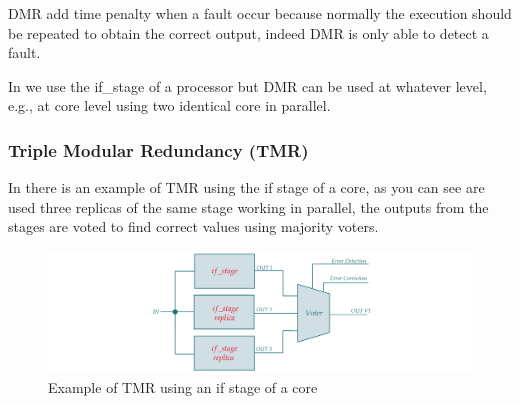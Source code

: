{{{{        		DMR add time penalty when a fault occur because normally the execution should be repeated to obtain the correct output, indeed DMR is only able to detect a fault. 
        		
        		In  we use the if\_stage of a processor but DMR can be used at whatever level, e.g., at core level using two identical core in parallel.
		    }
		    \subsubsection{Triple Modular Redundancy (TMR)}{
		        In  there is an example of TMR using the if stage of a core, as you can see are used three replicas of the same stage working in parallel, the outputs from the stages are voted to find correct values using majority voters.
		        
		        \begin{figure}[H]
        			\centering
        			\includegraphics[scale=0.2,center]{./images/TMR1.png}
        			\caption{Example of TMR using an if stage of a core}
        			\label{fig:TMR1}
        		\end{figure} 
        	
}}}}

